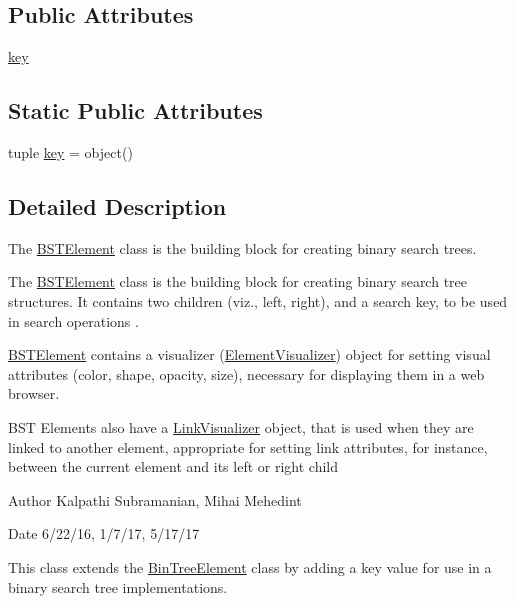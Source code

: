 \subsection*{Public Attributes}
\begin{DoxyCompactItemize}
\item 
\hyperlink{class_bridges_1_1_b_s_t_element_1_1_b_s_t_element_a2361f6985c8e968645c57ecdb837d000}{key}
\end{DoxyCompactItemize}
\subsection*{Static Public Attributes}
\begin{DoxyCompactItemize}
\item 
tuple \hyperlink{class_bridges_1_1_b_s_t_element_1_1_b_s_t_element_af976c2c03465e6d1bdfaa528587330b0}{key} = object()
\end{DoxyCompactItemize}


\subsection{Detailed Description}
The \hyperlink{class_bridges_1_1_b_s_t_element_1_1_b_s_t_element}{B\+S\+T\+Element} class is the building block for creating binary search trees. 

The \hyperlink{class_bridges_1_1_b_s_t_element_1_1_b_s_t_element}{B\+S\+T\+Element} class is the building block for creating binary search tree structures. It contains two children (viz., left, right), and a search key, to be used in search operations .

\hyperlink{class_bridges_1_1_b_s_t_element_1_1_b_s_t_element}{B\+S\+T\+Element} contains a visualizer (\hyperlink{namespace_bridges_1_1_element_visualizer}{Element\+Visualizer}) object for setting visual attributes (color, shape, opacity, size), necessary for displaying them in a web browser.

B\+S\+T Elements also have a \hyperlink{namespace_bridges_1_1_link_visualizer}{Link\+Visualizer} object, that is used when they are linked to another element, appropriate for setting link attributes, for instance, between the current element and its left or right child

\begin{DoxyAuthor}{Author}
Kalpathi Subramanian, Mihai Mehedint
\end{DoxyAuthor}
\begin{DoxyDate}{Date}
6/22/16, 1/7/17, 5/17/17
\end{DoxyDate}
This class extends the \hyperlink{namespace_bridges_1_1_bin_tree_element}{Bin\+Tree\+Element} class by adding a \textquotesingle{}key\textquotesingle{} value for use in a binary search tree implementations. 

